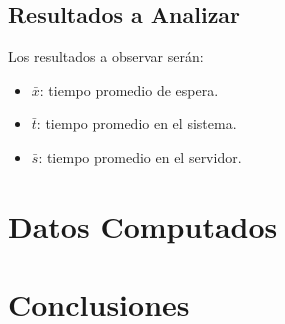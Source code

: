 \documentclass[10pt,letterpaper]{report}
\begin{document}
\subsection*{Resultados a Analizar}
Los resultados a observar serán:
\begin{itemize}
\item $\bar{x}$: tiempo promedio de espera. 
\item $\bar{t}$: tiempo promedio en el sistema. 
\item $\bar{s}$: tiempo promedio en el servidor. 
\end{itemize}
\section*{Datos Computados}
\section*{Conclusiones}
\end{document}
